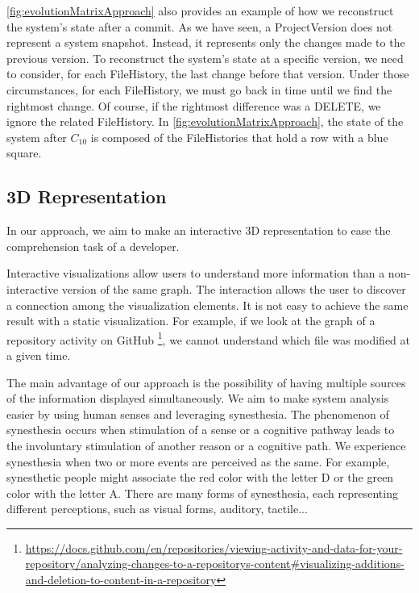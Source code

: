\autoref{fig:evolutionMatrixApproach} also provides an example of how we reconstruct the system's state after a commit. 
As we have seen, a ProjectVersion does not represent a system snapshot.
Instead, it represents only the changes made to the previous version. 
To reconstruct the system's state at a specific version, we need to consider, for each FileHistory, the last change before that version. 
Under those circumstances, for each FileHistory, we must go back in time until we find the rightmost change. Of course, if the rightmost difference was a DELETE, we ignore the related FileHistory.
In \autoref{fig:evolutionMatrixApproach}, the state of the system after $C_{10}$ is composed of the FileHistories that hold a row with a blue square. 



\subsection{3D Representation}
\label{s:3DRepr}
In our approach, we aim to make an interactive 3D representation to ease the comprehension task of a developer. 

Interactive visualizations allow users to understand more information than a non-interactive version of the same graph. The interaction allows the user to discover a connection among the visualization elements. It is not easy to achieve the same result with a static visualization. For example, if we look at the graph of a repository activity on GitHub \footnote{\url{https://docs.github.com/en/repositories/viewing-activity-and-data-for-your-repository/analyzing-changes-to-a-repositorys-content\#visualizing-additions-and-deletion-to-content-in-a-repository}}, we cannot understand which file was modified at a given time. 

The main advantage of our approach is the possibility of having multiple sources of the information displayed simultaneously. We aim to make system analysis easier by using human senses and leveraging synesthesia. The phenomenon of synesthesia occurs when stimulation of a sense or a cognitive pathway leads to the involuntary stimulation of another reason or a cognitive path. We experience synesthesia when two or more events are perceived as the same. 
For example, synesthetic people might associate the red color with the letter D or the green color with the letter A. 
There are many forms of synesthesia, each representing different perceptions, such as visual forms, auditory, tactile...

